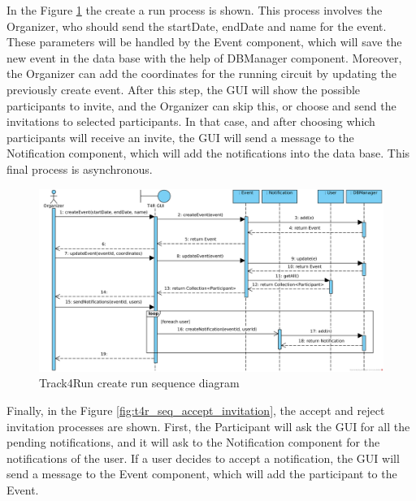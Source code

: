 \documentclass[a4paper, hidelinks, 12pt]{report}
\begin{document}
	In the Figure \ref{fig:t4r_seq_create_run} the create a run process is shown. This process involves the Organizer, who should send the startDate, endDate and name for the event. These parameters will be handled by the Event component, which will save the new event in the data base with the help of DBManager component. Moreover, the Organizer can add the coordinates for the running circuit by updating the previously create event. After this step, the GUI will show the possible participants to invite, and the Organizer can skip this, or choose and send the invitations to selected participants. In that case, and after choosing which participants will receive an invite, the GUI will send a message to the Notification component, which will add the notifications into the data base. This final process is asynchronous.\\
	\begin{figure}[H]
		\centering
		\includegraphics[width=1\textwidth]{diagrams/sequence_diagrams/t4r_create_run.png}
		\caption[Track4Run create run sequence diagram]{Track4Run create run sequence diagram}
		\label{fig:t4r_seq_create_run}
	\end{figure}
	
	Finally, in the Figure \ref{fig:t4r_seq_accept_invitation}, the accept and reject invitation processes are shown. First, the Participant will ask the GUI for all the pending notifications, and it will ask to the Notification component for the notifications of the user. If a user decides to accept a notification, the GUI will send a message to the Event component, which will add the participant to the Event.\\
\end{document}
